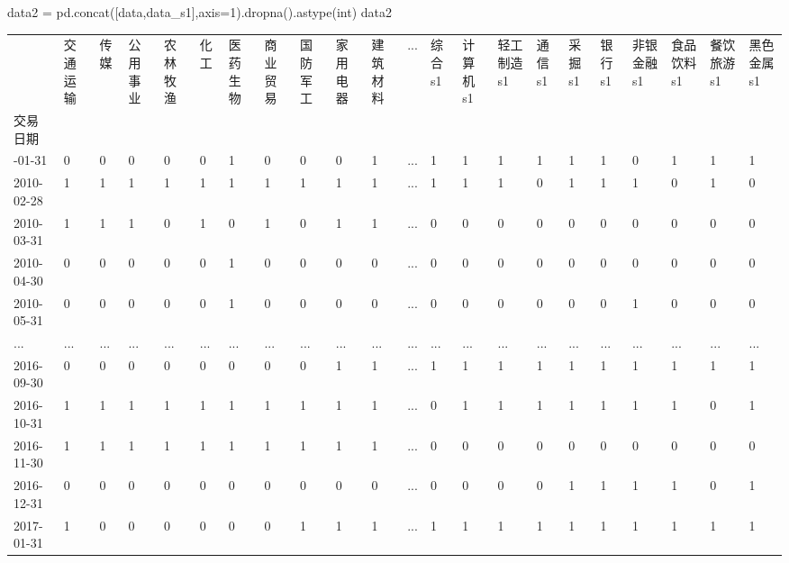 \documentclass[
  letterpaper,
  DIV=11,
  numbers=noendperiod]{scrreprt}
\newenvironment{Shaded}{\begin{snugshade}}{\end{snugshade}}
\newcommand{\BuiltInTok}[1]{\textcolor[rgb]{0.00,0.23,0.31}{#1}}
\newcommand{\DecValTok}[1]{\textcolor[rgb]{0.68,0.00,0.00}{#1}}
\newcommand{\NormalTok}[1]{\textcolor[rgb]{0.00,0.23,0.31}{#1}}
\newcommand{\OperatorTok}[1]{\textcolor[rgb]{0.37,0.37,0.37}{#1}}
\begin{document}
\begin{Shaded}
\begin{Highlighting}[]
\NormalTok{data2 }\OperatorTok{=}\NormalTok{ pd.concat([data,data\_s1],axis}\OperatorTok{=}\DecValTok{1}\NormalTok{).dropna().astype(}\BuiltInTok{int}\NormalTok{)}
\NormalTok{data2}
\end{Highlighting}
\end{Shaded}

\begin{longtable}[]{@{}llllllllllllllllllllll@{}}
\toprule\noalign{}
& 交通运输 & 传媒 & 公用事业 & 农林牧渔 & 化工 & 医药生物 & 商业贸易 &
国防军工 & 家用电器 & 建筑材料 & ... & 综合s1 & 计算机s1 & 轻工制造s1 &
通信s1 & 采掘s1 & 银行s1 & 非银金融s1 & 食品饮料s1 & 餐饮旅游s1 &
黑色金属s1 \\
交易日期 & & & & & & & & & & & & & & & & & & & & & \\
\midrule\noalign{}
\endhead
\bottomrule\noalign{}
\endlastfoot
2010-01-31 & 0 & 0 & 0 & 0 & 0 & 1 & 0 & 0 & 0 & 1 & ... & 1 & 1 & 1 & 1
& 1 & 1 & 0 & 1 & 1 & 1 \\
2010-02-28 & 1 & 1 & 1 & 1 & 1 & 1 & 1 & 1 & 1 & 1 & ... & 1 & 1 & 1 & 0
& 1 & 1 & 1 & 0 & 1 & 0 \\
2010-03-31 & 1 & 1 & 1 & 0 & 1 & 0 & 1 & 0 & 1 & 1 & ... & 0 & 0 & 0 & 0
& 0 & 0 & 0 & 0 & 0 & 0 \\
2010-04-30 & 0 & 0 & 0 & 0 & 0 & 1 & 0 & 0 & 0 & 0 & ... & 0 & 0 & 0 & 0
& 0 & 0 & 0 & 0 & 0 & 0 \\
2010-05-31 & 0 & 0 & 0 & 0 & 0 & 1 & 0 & 0 & 0 & 0 & ... & 0 & 0 & 0 & 0
& 0 & 0 & 1 & 0 & 0 & 0 \\
... & ... & ... & ... & ... & ... & ... & ... & ... & ... & ... & ... &
... & ... & ... & ... & ... & ... & ... & ... & ... & ... \\
2016-09-30 & 0 & 0 & 0 & 0 & 0 & 0 & 0 & 0 & 1 & 1 & ... & 1 & 1 & 1 & 1
& 1 & 1 & 1 & 1 & 1 & 1 \\
2016-10-31 & 1 & 1 & 1 & 1 & 1 & 1 & 1 & 1 & 1 & 1 & ... & 0 & 1 & 1 & 1
& 1 & 1 & 1 & 1 & 0 & 1 \\
2016-11-30 & 1 & 1 & 1 & 1 & 1 & 1 & 1 & 1 & 1 & 1 & ... & 0 & 0 & 0 & 0
& 0 & 0 & 0 & 0 & 0 & 0 \\
2016-12-31 & 0 & 0 & 0 & 0 & 0 & 0 & 0 & 0 & 0 & 0 & ... & 0 & 0 & 0 & 0
& 1 & 1 & 1 & 1 & 0 & 1 \\
2017-01-31 & 1 & 0 & 0 & 0 & 0 & 0 & 0 & 1 & 1 & 1 & ... & 1 & 1 & 1 & 1
& 1 & 1 & 1 & 1 & 1 & 1 \\
\end{longtable}
\end{document}
